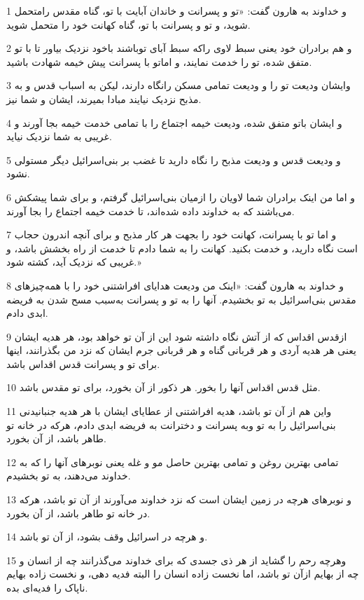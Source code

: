 \par 1 و خداوند به هارون گفت: «تو و پسرانت و خاندان آبایت با تو، گناه مقدس رامتحمل شوید، و تو و پسرانت با تو، گناه کهانت خود را متحمل شوید.
\par 2 و هم برادران خود یعنی سبط لاوی راکه سبط آبای توباشند باخود نزدیک بیاور تا با تو متفق شده، تو را خدمت نمایند، و اماتو با پسرانت پیش خیمه شهادت باشید. 
\par 3 وایشان ودیعت تو را و ودیعت تمامی مسکن رانگاه دارند، لیکن به اسباب قدس و به مذبح نزدیک نیایند مبادا بمیرند، ایشان و شما نیز.
\par 4 و ایشان باتو متفق شده، ودیعت خیمه اجتماع را با تمامی خدمت خیمه بجا آورند و غریبی به شما نزدیک نیاید.
\par 5 و ودیعت قدس و ودیعت مذبح را نگاه دارید تا غضب بر بنی‌اسرائیل دیگر مستولی نشود.
\par 6 و اما من اینک برادران شما لاویان را ازمیان بنی‌اسرائیل گرفتم، و برای شما پیشکش می‌باشند که به خداوند داده شده‌اند، تا خدمت خیمه اجتماع را بجا آورند.
\par 7 و اما تو با پسرانت، کهانت خود را بجهت هر کار مذبح و برای آنچه اندرون حجاب است نگاه دارید، و خدمت بکنید. کهانت را به شما دادم تا خدمت از راه بخشش باشد، و غریبی که نزدیک آید، کشته شود.»
\par 8 و خداوند به هارون گفت: «اینک من ودیعت هدایای افراشتنی خود را با همه‌چیزهای مقدس بنی‌اسرائیل به تو بخشیدم. آنها را به تو و پسرانت به‌سبب مسح شدن به فریضه ابدی دادم.
\par 9 ازقدس اقداس که از آتش نگاه داشته شود این از آن تو خواهد بود، هر هدیه ایشان یعنی هر هدیه آردی و هر قربانی گناه و هر قربانی جرم ایشان که نزد من بگذرانند، اینها برای تو و پسرانت قدس اقداس باشد.
\par 10 مثل قدس اقداس آنها را بخور. هر ذکور از آن بخورد، برای تو مقدس باشد.
\par 11 واین هم از آن تو باشد، هدیه افراشتنی از عطایای ایشان با هر هدیه جنبانیدنی بنی‌اسرائیل را به تو وبه پسرانت و دخترانت به فریضه ابدی دادم، هرکه در خانه تو طاهر باشد، از آن بخورد.
\par 12 تمامی بهترین روغن و تمامی بهترین حاصل مو و غله یعنی نوبرهای آنها را که به خداوند می‌دهند، به تو بخشیدم.
\par 13 و نوبرهای هرچه در زمین ایشان است که نزد خداوند می‌آورند از آن تو باشد، هرکه در خانه تو طاهر باشد، از آن بخورد.
\par 14 و هرچه در اسرائیل وقف بشود، از آن تو باشد.
\par 15 وهرچه رحم را گشاید از هر ذی جسدی که برای خداوند می‌گذرانند چه از انسان و چه از بهایم ازآن تو باشد، اما نخست زاده انسان را البته فدیه دهی، و نخست زاده بهایم ناپاک را فدیه‌ای بده.
